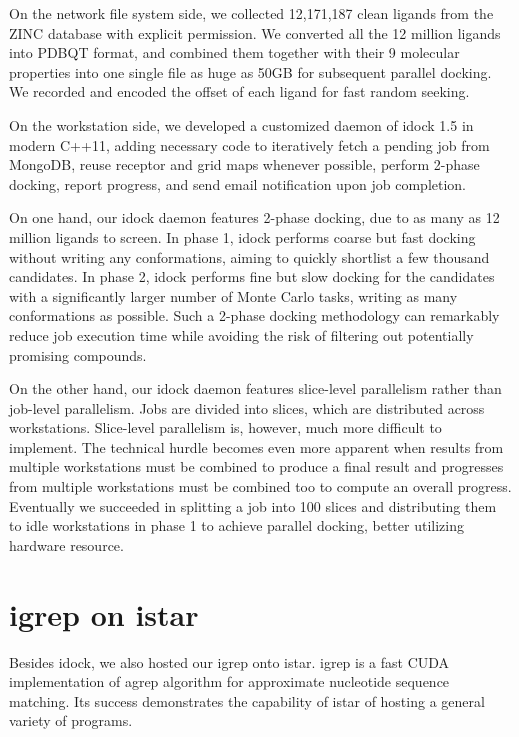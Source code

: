 \documentclass{bioinfo}
\begin{document}
On the network file system side, we collected 12,171,187 clean ligands from the ZINC database \citep{532,1178} with explicit permission. We converted all the 12 million ligands into PDBQT format, and combined them together with their 9 molecular properties into one single file as huge as 50GB for subsequent parallel docking. We recorded and encoded the offset of each ligand for fast random seeking.

On the workstation side, we developed a customized daemon of idock 1.5 in modern C++11, adding necessary code to iteratively fetch a pending job from MongoDB, reuse receptor and grid maps whenever possible, perform 2-phase docking, report progress, and send email notification upon job completion.

On one hand, our idock daemon features 2-phase docking, due to as many as 12 million ligands to screen. In phase 1, idock performs coarse but fast docking without writing any conformations, aiming to quickly shortlist a few thousand candidates. In phase 2, idock performs fine but slow docking for the candidates with a significantly larger number of Monte Carlo tasks, writing as many conformations as possible. Such a 2-phase docking methodology can remarkably reduce job execution time while avoiding the risk of filtering out potentially promising compounds.

On the other hand, our idock daemon features slice-level parallelism rather than job-level parallelism. Jobs are divided into slices, which are distributed across workstations. Slice-level parallelism is, however, much more difficult to implement. The technical hurdle becomes even more apparent when results from multiple workstations must be combined to produce a final result and progresses from multiple workstations must be combined too to compute an overall progress. Eventually we succeeded in splitting a job into 100 slices and distributing them to idle workstations in phase 1 to achieve parallel docking, better utilizing hardware resource.

\section{igrep on istar}

Besides idock, we also hosted our igrep \citep{1138} onto istar. igrep is a fast CUDA implementation of agrep algorithm for approximate nucleotide sequence matching. Its success demonstrates the capability of istar of hosting a general variety of programs.
\end{document}
